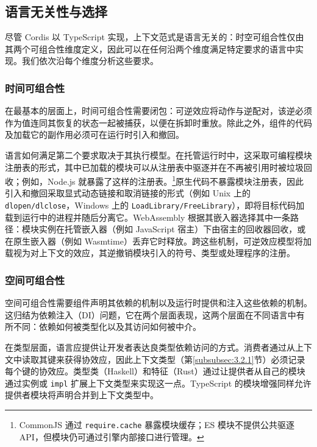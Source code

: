 \subsection{语言无关性与选择}\label{sec:6.4}

尽管 Cordis 以 TypeScript 实现，上下文范式是语言无关的：时空可组合性仅由其两个可组合性维度定义，因此可以在任何沿两个维度满足特定要求的语言中实现。我们依次沿每个维度分析这些要求。

\subsubsection{时间可组合性}

在最基本的层面上，时间可组合性需要闭包：可逆效应将动作与逆配对，该逆必须作为值连同其恢复的状态一起被捕获，以便在拆卸时重放。除此之外，组件的代码及加载它的副作用必须可在运行时引入和撤回。

语言如何满足第二个要求取决于其执行模型。在托管运行时中，这采取可编程模块注册表的形式，其中已加载的模块可以从注册表中驱逐并在不再被引用时被垃圾回收；例如，Node.js 就暴露了这样的注册表。\footnote{CommonJS 通过 \texttt{require.cache} 暴露模块缓存；ES 模块不提供公共驱逐 API，但模块仍可通过引擎内部接口进行管理。}原生代码不暴露模块注册表，因此引入和撤回采取显式动态链接和取消链接的形式（例如 Unix 上的 \texttt{dlopen/dlclose}，Windows 上的 \texttt{LoadLibrary/FreeLibrary}）\cite{ref59}，即将目标代码加载到运行中的进程并随后分离它。WebAssembly 根据其嵌入器选择其中一条路径：模块实例在托管嵌入器（例如 JavaScript 宿主）下由宿主的回收器回收，或在原生嵌入器（例如 Wasmtime）丢弃它时释放。跨这些机制，可逆效应模型将加载视为对上下文的效应，其逆撤销模块引入的符号、类型或处理程序的注册。

\subsubsection{空间可组合性}

空间可组合性需要组件声明其依赖的机制以及运行时提供和注入这些依赖的机制。这归结为依赖注入（DI）问题\cite{ref38}，它在两个层面表现，这两个层面在不同语言中有所不同：依赖如何被类型化以及其访问如何被中介。

在类型层面，语言应提供让开发者表达良类型依赖访问的方式。消费者通过从上下文中读取其键来获得协效应，因此上下文类型（第\ref{subsubsec:3.2.1}节）必须记录每个键的协效应。类型类（Haskell）\cite{ref60}和特征（Rust）\cite{ref61}通过让提供者从自己的模块通过实例或 \texttt{impl} 扩展上下文类型来实现这一点\cite{ref62}。TypeScript 的模块增强\cite{ref63}同样允许提供者模块将声明合并到上下文类型中。

